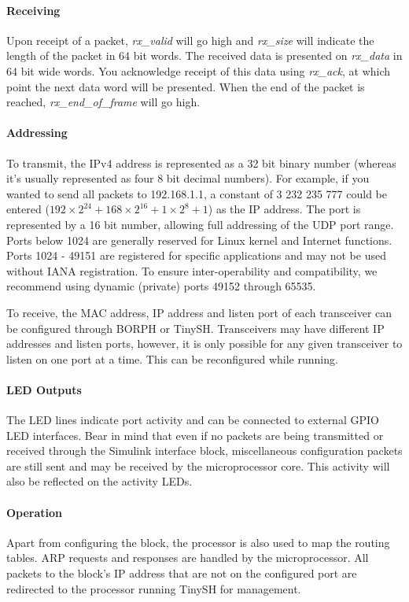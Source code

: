 \documentclass{article}
\begin{document}
{\paragraph{Receiving}
Upon receipt of a packet, \textit{rx\_valid} will go high and \textit{rx\_size} will indicate the length of the packet in 64 bit words. The received data is presented on \textit{rx\_data} in 64 bit wide words. You acknowledge receipt of this data using \textit{rx\_ack}, at which point the next data word will be presented. When the end of the packet is reached, \textit{rx\_end\_of\_frame} will go high.

\paragraph{Addressing}
To transmit, the IPv4 address is represented as a 32 bit binary number (whereas it's usually represented as four 8 bit decimal numbers). For example, if you wanted to send all packets to 192.168.1.1, a constant of 3 232 235 777 could be entered ($192\times2^{24} + 168\times2^{16} + 1\times2^8 + 1$) as the IP address. The port is represented by a 16 bit number, allowing full addressing of the UDP port range. Ports below 1024 are generally reserved for Linux kernel and Internet functions. Ports 1024 - 49151 are registered for specific applications and may not be used without IANA registration. To ensure inter-operability and compatibility, we recommend using dynamic (private) ports 49152 through 65535.

To receive, the MAC address, IP address and listen port of each transceiver can be configured through BORPH or TinySH. Transceivers may have different IP addresses and listen ports, however, it is only possible for any given transceiver to listen on one port at a time. This can be reconfigured while running.

\paragraph{LED Outputs}
The LED lines indicate port activity and can be connected to external GPIO LED interfaces. Bear in mind that even if no packets are being transmitted or received through the Simulink interface block, miscellaneous configuration packets are still sent and may be received by the microprocessor core. This activity will also be reflected on the activity LEDs.

\paragraph{Operation}
Apart from configuring the block, the processor is also used to map the routing tables. ARP requests and responses are handled by the microprocessor. All packets to the block's IP address that are not on the configured port are redirected to the processor running TinySH for management. 

} 
\end{document}
